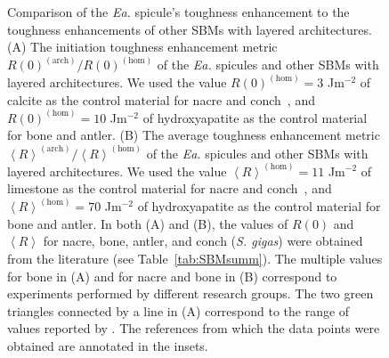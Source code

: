 \documentclass[12pt,onecolumn]{article}
\makeatletter
\newcommand{\EA}{\textit{Ea.\@}\xspace}
\makeatother
\begin{document}
\begin{bibunit}
\begin{figure}[ht!]
{			Comparison of the \EA spicule's toughness enhancement to the toughness enhancements of other SBMs with layered architectures. (A)  The initiation toughness enhancement metric $R(0)^{(\mathrm{arch})}/R(0)^{(\mathrm{hom})}$ of the \EA spicules and other SBMs with layered architectures. We used the value $R(0)^{(\mathrm{hom})}=3$ Jm$^{-2}$ of calcite as the control material for nacre and conch~\cite{wegst2004mechanical}, and $R(0)^{(\mathrm{hom})}=10$ Jm$^{-2}$ of hydroxyapatite \cite{wegst2004mechanical} as the control material for bone and antler. (B) The average toughness enhancement metric $\left< R\right>^{(\mathrm{arch})}/\left< R\right>^{(\mathrm{hom})}$ of the \EA spicules and other SBMs with layered architectures. We used the value $\left< R\right>^{(\mathrm{hom})}=11$ Jm$^{-2}$ of limestone as the control material for nacre and conch~\cite{carmichael1982crc}, and $\left< R\right>^{(\mathrm{hom})}=70$ Jm$^{-2}$ of hydroxyapatite \cite{tenhuisen1995formation} as the control material for bone and antler. In both (A) and (B), the values of $R(0)$ and $\left< R \right>$ for nacre, bone, antler, and conch (\textit{S. gigas}) were obtained from the literature (see Table~\ref{tab:SBMsumm}). The multiple values for bone in (A) and for nacre and bone in (B) correspond to experiments performed by different research groups. The two green triangles connected by a line in (A) correspond to the range of values reported by \cite{koester2008true}. The references from which the data points were obtained are annotated in the insets. 
			}
			\label{fig:SBMcomp}
			\end{figure}
			

\end{bibunit}
\end{document}
